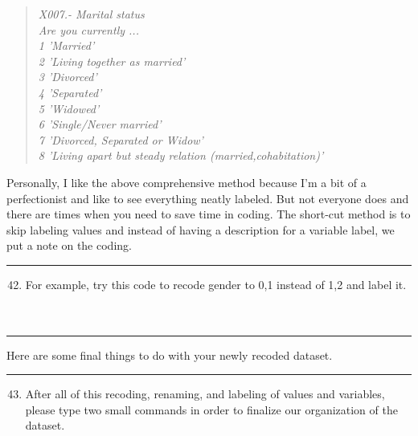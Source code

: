 \documentclass{tufte-handout}
\begin{document}
\begin{quote}
{\em
X007.- Marital status\\
Are you currently ...\\
1 'Married'\\
2 'Living together as married'\\
3 'Divorced'\\
4 'Separated'\\
5 'Widowed'\\
6 'Single/Never married'\\
7 'Divorced, Separated or Widow'\\
8 'Living apart but steady relation (married,cohabitation)'}\\
\end{quote}

\medskip
{}
\medskip

Personally, I like the above comprehensive method because I'm a bit of a perfectionist and like to see everything neatly labeled. But not everyone does and there are times when you need to save time in coding. The short-cut method is to skip labeling values and instead of having a description for a variable label, we put a note on the coding.

\bigskip
\hrule
\bigskip

\begin{enumerate}[leftmargin=.5in]
\setcounter{enumi}{41}
	\item For example, try this code to recode gender to 0,1 instead of 1,2 and label it.\\
\medskip
{}\\
\\
\end{enumerate}

\bigskip
\hrule
\bigskip


\medskip
{}
\medskip

Here are some final things to do with your newly recoded dataset.

\bigskip
\hrule
\bigskip

\begin{enumerate}[leftmargin=.5in]
\setcounter{enumi}{42}
	\item After all of this recoding, renaming, and labeling of values and variables, please type two small commands in order to finalize our organization of the dataset.\\
\medskip
{} \\
 \\
\end{enumerate}
\end{document}
